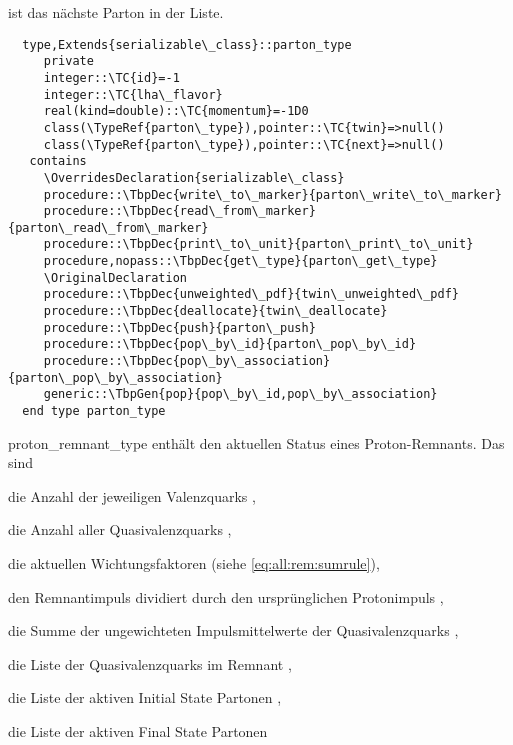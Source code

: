  ist das nächste Parton in der Liste.
\begin{Verbatim}
  type,Extends{serializable\_class}::parton_type
     private
     integer::\TC{id}=-1
     integer::\TC{lha\_flavor}
     real(kind=double)::\TC{momentum}=-1D0
     class(\TypeRef{parton\_type}),pointer::\TC{twin}=>null()
     class(\TypeRef{parton\_type}),pointer::\TC{next}=>null()
   contains
     \OverridesDeclaration{serializable\_class}
     procedure::\TbpDec{write\_to\_marker}{parton\_write\_to\_marker}
     procedure::\TbpDec{read\_from\_marker}{parton\_read\_from\_marker}
     procedure::\TbpDec{print\_to\_unit}{parton\_print\_to\_unit}
     procedure,nopass::\TbpDec{get\_type}{parton\_get\_type}
     \OriginalDeclaration
     procedure::\TbpDec{unweighted\_pdf}{twin\_unweighted\_pdf}
     procedure::\TbpDec{deallocate}{twin\_deallocate}
     procedure::\TbpDec{push}{parton\_push}
     procedure::\TbpDec{pop\_by\_id}{parton\_pop\_by\_id}
     procedure::\TbpDec{pop\_by\_association}{parton\_pop\_by\_association}
     generic::\TbpGen{pop}{pop\_by\_id,pop\_by\_association}
  end type parton_type
\end{Verbatim}
proton\_remnant\_type enthält den aktuellen Status eines Proton-Remnants. Das sind

die Anzahl der jeweiligen Valenzquarks ,

die Anzahl aller Quasivalenzquarks ,

die aktuellen Wichtungsfaktoren  (siehe \eqref{eq:all:rem:sumrule}),

den Remnantimpuls dividiert durch den ursprünglichen Protonimpuls , 

die Summe der ungewichteten Impulsmittelwerte der Quasivalenzquarks ,

die Liste der Quasivalenzquarks im Remnant ,

die Liste der aktiven Initial State Partonen ,

die Liste der aktiven Final State Partonen 

